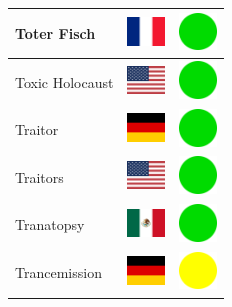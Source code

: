 \documentclass[12pt, a4paper, twoside]{report}
\begin{document}
\begin{center}
\begin{longtable}{|p{5cm}|p{2cm}|p{2cm}|}
 Toter Fisch                                                & \includegraphics[width=1cm]{../img/flags/fr} &   \includegraphics[width=1cm]{../likes/y} \\ \hline
 Toxic Holocaust                                            & \includegraphics[width=1cm]{../img/flags/us} &   \includegraphics[width=1cm]{../likes/y} \\ \hline
 Traitor                                                    & \includegraphics[width=1cm]{../img/flags/de} &   \includegraphics[width=1cm]{../likes/y} \\ \hline
 Traitors                                                   & \includegraphics[width=1cm]{../img/flags/us} &   \includegraphics[width=1cm]{../likes/y} \\ \hline
 Tranatopsy                                                 & \includegraphics[width=1cm]{../img/flags/mx} &   \includegraphics[width=1cm]{../likes/y} \\ \hline
 Trancemission                                              & \includegraphics[width=1cm]{../img/flags/de} &   \includegraphics[width=1cm]{../likes/m} \\ \hline

\end{longtable}
\end{center}
\end{document}
